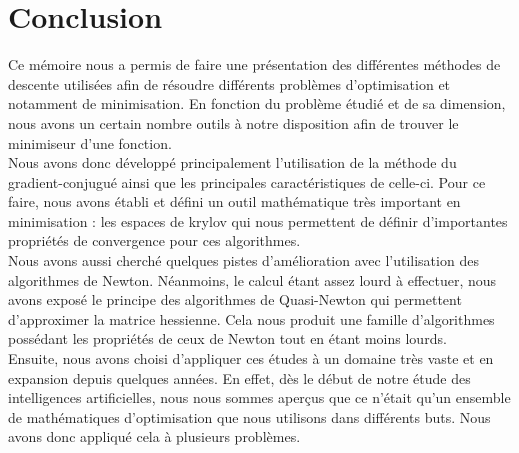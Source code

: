 \chapter{Conclusion}

Ce mémoire nous a permis de faire une présentation des différentes méthodes de descente utilisées afin de résoudre différents problèmes d'optimisation et notamment de minimisation. En fonction du problème étudié et de sa dimension, nous avons un certain nombre outils à notre disposition afin de trouver le minimiseur d'une fonction. \\

Nous avons donc développé principalement l'utilisation de la méthode du gradient-conjugué ainsi que les principales caractéristiques de celle-ci. Pour ce faire, nous avons établi et défini un outil mathématique très important en minimisation : les espaces de krylov qui nous permettent de définir d'importantes propriétés de convergence pour ces algorithmes.\\

 Nous avons aussi cherché quelques pistes d'amélioration avec l'utilisation des algorithmes de Newton. Néanmoins, le calcul étant assez lourd à effectuer, nous avons exposé le principe des algorithmes de Quasi-Newton qui permettent d'approximer la matrice hessienne. Cela nous produit une famille d'algorithmes possédant les propriétés de ceux de Newton tout en étant moins lourds.\\

Ensuite, nous avons choisi d'appliquer ces études à un domaine très vaste et en expansion depuis quelques années. En effet, dès le début de notre étude des intelligences artificielles, nous nous sommes aperçus que ce n'était qu'un ensemble de mathématiques d'optimisation que nous utilisons dans différents buts. Nous avons donc appliqué cela à plusieurs problèmes. 